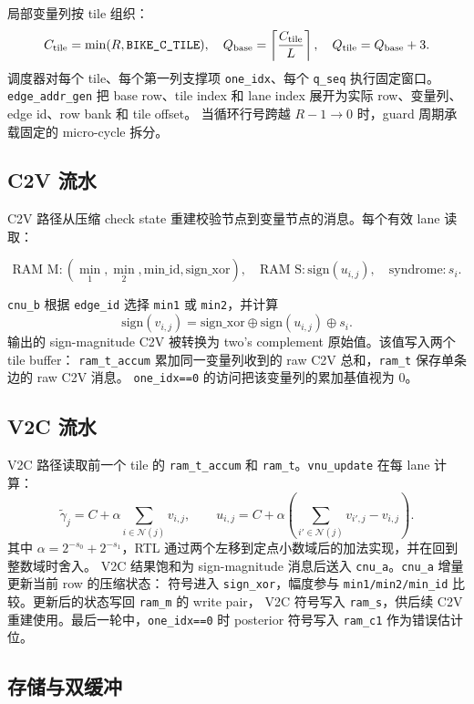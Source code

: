 \documentclass{article}
\begin{document}
局部变量列按 tile 组织：
\[
  C_{\rm tile}=\min(R,\text{\texttt{BIKE\_C\_TILE}}),\quad
  Q_{\rm base}=\left\lceil\frac{C_{\rm tile}}{L}\right\rceil,\quad
  Q_{\rm tile}=Q_{\rm base}+3 .
\]
调度器对每个 tile、每个第一列支撑项 \texttt{one\_idx}、每个 \texttt{q\_seq} 执行固定窗口。\texttt{edge\_addr\_gen}
把 base row、tile index 和 lane index 展开为实际 row、变量列、edge id、row bank 和 tile offset。
当循环行号跨越 $R-1\rightarrow 0$ 时，guard 周期承载固定的 micro-cycle 拆分。

\subsection{C2V 流水}

C2V 路径从压缩 check state 重建校验节点到变量节点的消息。每个有效 lane 读取：

\[
  \text{RAM M}: (\min_1,\min_2,\text{min\_id},\text{sign\_xor}),\quad
  \text{RAM S}: \text{sign}(u_{i,j}),\quad
  \text{syndrome}: s_i .
\]

\texttt{cnu\_b} 根据 \texttt{edge\_id} 选择 \texttt{min1} 或 \texttt{min2}，并计算
\[
  \text{sign}(v_{i,j})=\text{sign\_xor}\oplus \text{sign}(u_{i,j})\oplus s_i .
\]
输出的 sign-magnitude C2V 被转换为 two's complement 原始值。该值写入两个 tile buffer：
\texttt{ram\_t\_accum} 累加同一变量列收到的 raw C2V 总和，\texttt{ram\_t} 保存单条边的 raw C2V 消息。
\texttt{one\_idx==0} 的访问把该变量列的累加基值视为 0。

\subsection{V2C 流水}

V2C 路径读取前一个 tile 的 \texttt{ram\_t\_accum} 和 \texttt{ram\_t}。\texttt{vnu\_update} 在每 lane 计算：
\[
  \tilde\gamma_j = C + \alpha\sum_{i\in\mathcal{N}(j)} v_{i,j},
  \qquad
  u_{i,j}=C+\alpha\left(\sum_{i'\in\mathcal{N}(j)}v_{i',j}-v_{i,j}\right).
\]
其中 $\alpha=2^{-s_0}+2^{-s_1}$，RTL 通过两个左移到定点小数域后的加法实现，并在回到整数域时舍入。
V2C 结果饱和为 sign-magnitude 消息后送入 \texttt{cnu\_a}。\texttt{cnu\_a} 增量更新当前 row 的压缩状态：
符号进入 \texttt{sign\_xor}，幅度参与 \texttt{min1/min2/min\_id} 比较。更新后的状态写回 \texttt{ram\_m} 的 write pair，
V2C 符号写入 \texttt{ram\_s}，供后续 C2V 重建使用。最后一轮中，\texttt{one\_idx==0} 时 posterior 符号写入 \texttt{ram\_c1}
作为错误估计位。

\subsection{存储与双缓冲}
\end{document}
